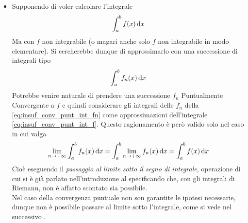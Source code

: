 \begin{itemize}
\begin{figure}[H]
			\begin{subfigure}{.49\textwidth}
				\centering
				\caption{$f(x) \quad x \in \intervalclose{0}{1}$}
			\end{subfigure}
			\caption{$f_n(x) \in \cntclass{\infty}(\intervalclose{0}{1}; \R)$, mentre la funzione limite puntuale $f$ è discontinua.}
			\label{fig:cont_fn_non_passa_a_f}
		\end{figure}
	\item
		Supponendo di voler calcolare l'integrale
		\begin{equation}
			\label{eq:insuf_conv_punt_int_f}
			\int_a^b f(x) \,\mathrm{d}{x}
		\end{equation}
		Ma con $f$ non integrabile (o magari anche solo $f$ non integrabile in modo elementare). Si cercherebbe dunque di approssimarlo con una successione di integrali tipo
		\begin{equation}
			\label{eq:insuf_conv_punt_int_fn}
			\int_a^b f_n(x) \,\mathrm{d}{x}
		\end{equation}
		Potrebbe venire naturale di prendere una successione $f_n$ Puntualmente Convergente a $f$ e quindi considerare gli integrali delle $f_n$ della \cref{eq:insuf_conv_punt_int_fn} come approssimazioni dell'integrale \cref{eq:insuf_conv_punt_int_f}. Questo ragionamento è però valido solo nel caso in cui valga
		\begin{equation}
			\label{eq:conv_punt_pass_lim_integrale}
			\lim\limits_{n \to +\infty} \int_a^b f_n(x) \,\mathrm{d}{x} = \int_a^b \lim\limits_{n \to +\infty} f_n(x) \,\mathrm{d}{x} = \int_a^b f(x) \,\mathrm{d}{x}
		\end{equation}
		Cioè eseguendo il \textit{passaggio al limite sotto il segno di integrale}, operazione di cui si è già parlato nell'introduzione al  specificando che, con gli integrali di Riemann, non è affatto scontato sia possibile.\\
		Nel caso della convergenza puntuale non son garantite le ipotesi necessarie, dunque non è possibile passare al limite sotto l'integrale, come si vede nel successivo .
\end{itemize}
